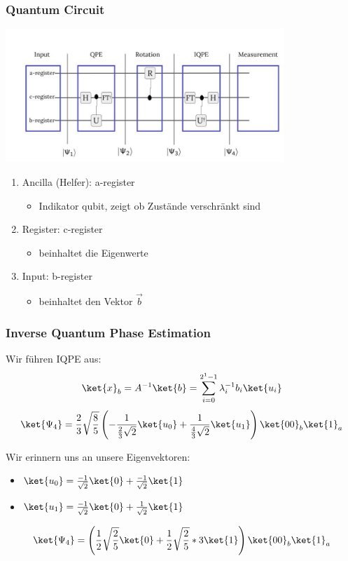 \begin{frame}
    \frametitle{Quantum Circuit}
    \begin{center}
    \includegraphics[width=10.5cm]{img/hhl_circuit/hhl_circuit.jpg}
    \end{center}
    \begin{enumerate}
        \item Ancilla (Helfer): a-register
        \begin{itemize}
            \item Indikator qubit, zeigt ob Zustände verschränkt sind
        \end{itemize}

        \item Register: c-register
        \begin{itemize}
            \item beinhaltet die Eigenwerte
        \end{itemize}
        
        \item Input: b-register 
        \begin{itemize}
            \item beinhaltet den Vektor $\vec{b}$
        \end{itemize}
        
    \end{enumerate}
   \end{frame}



\begin{frame}
    \frametitle{Inverse Quantum Phase Estimation}

    Wir führen IQPE aus:
    $$ \ket{x}_b =  A^{-1} \ket{b} = 
    \sum_{i=0}^{2^{1}-1} 
    \lambda_i^{-1} b_i\ket{u_i} $$
    $$\ket{\Psi_4}=\frac{2}{3}\sqrt{\frac{8}{5}} \left( -\frac{1}{\frac{2}{3}\sqrt{2}} \ket{u_0} +\frac{1}   {\frac{4}{3}\sqrt{2}}  \ket{u_1}\right)  \ket{00}_b \ket{1}_a $$

    \hfil

    Wir erinnern uns an unsere Eigenvektoren:
    \begin{itemize}
        \item $ \ket{u_0} = \frac{-1}{\sqrt{2}}\ket{0} + \frac{-1}{\sqrt{2}}\ket{1}$ 
        \item $ \ket{u_1}= \frac{-1}{\sqrt{2}}\ket{0} + \frac{1}{\sqrt{2}}\ket{1}$ 
    \end{itemize}

    $$ \ket{\Psi_4}= \left(\frac{1}{2}\sqrt{\frac{2}{5}} \ket{0} +\frac{1}{2}\sqrt{\frac{2}{5}} * 3 \ket{1} \right) \ket{00}_b \ket{1}_a $$

\end{frame}


